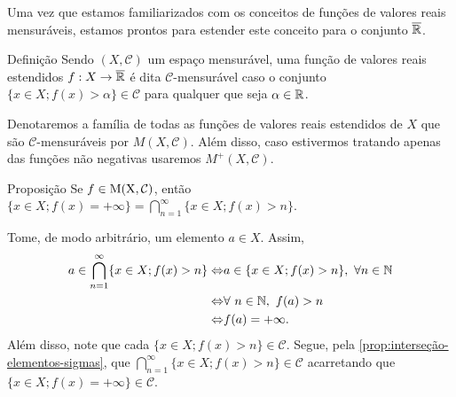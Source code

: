     Uma vez que estamos familiarizados com os conceitos de funções de valores reais mensuráveis, estamos prontos para estender este conceito para o conjunto $\operatorname{\overline{\mathbb{R}}}$.
    \begin{env}{Definição}
    \label{def:familia-funcoes-mensuraveis}
        Sendo $(X, \mathcal{C})$ um espaço mensurável, uma função de valores reais estendidos $f: X \to \operatorname{\overline{\mathbb{R}}}$ é dita $\mathcal{C}$-mensurável caso o conjunto
        $\{x \in X; f(x) > \alpha\} \in \mathcal{C}$ para qualquer que seja $\alpha \in \mathbb{R}$. 
        \vspace{-0.4cm}
    \end{env}

	Denotaremos a família de todas as funções de valores reais estendidos de $X$ que são $\mathcal{C}$-mensuráveis por $M(X, \mathcal{C})$.
	Além disso, caso estivermos tratando apenas das funções não negativas usaremos $M^+(X, \mathcal{C})$.
    \begin{env}{Proposição}
    \label{prop:identidade-intersecao-mais-infinito}
        Se $f \in \operatorname{M(X, \mathcal{C} )}$, então $\{x \in X; f(x) = +\infty\} = \displaystyle \bigcap_{n = 1}^\infty \{x \in X; f(x) > n\}$.
    \end{env}
    \begin{prova}
        Tome, de modo arbitrário, um elemento $a \in X$. 
        Assim, 
        \begin{align*}
            a \in \bigcap_{n = 1}^\infty \{x \in X; f(x) > n\} 
            \Leftrightarrow & a \in \{x \in X; f(x) > n\}, \ \forall n \in \N\\
            \Leftrightarrow & \forall\ n \in \N,\ f(a) > n\\
            \Leftrightarrow & f(a) = +\infty.  
        \end{align*}
    Além disso, note que cada $\{x \in X; f(x) > n\} \in \mathcal{C}$.
    Segue, pela \ref{prop:interseção-elementos-sigmas}, que \linebreak $\displaystyle \bigcap_{n = 1}^\infty \{x \in X; f(x) > n\} \in \mathcal{C}$ acarretando que $\{x \in X; f(x) = +\infty\} \in \mathcal{C}$. 
    \end{prova}


